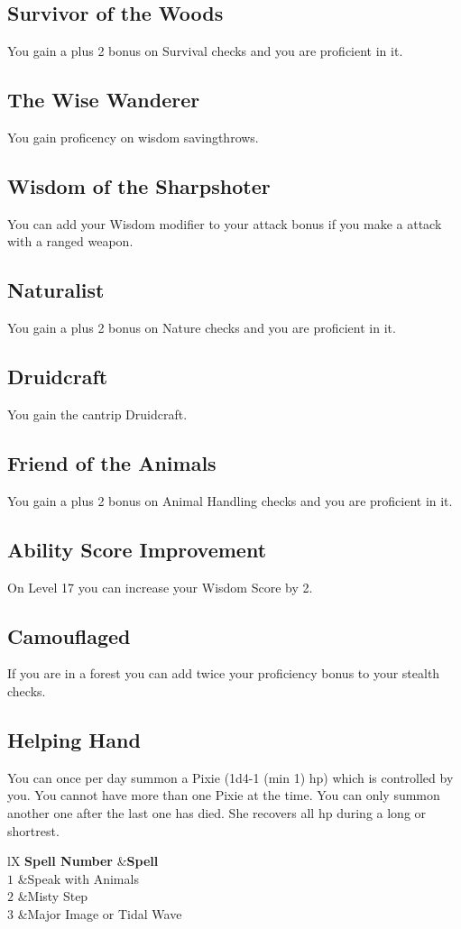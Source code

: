 \documentclass[a4paper,10pt,twoside,twocolumn]{dndbook} %
\begin{document}
	\subsection{Survivor of the Woods}
	You gain a plus 2 bonus on Survival checks and you are proficient in it.
	\subsection{The Wise Wanderer}
	You gain proficency on wisdom savingthrows.
	\subsection{Wisdom of the Sharpshoter}
	You can add your Wisdom modifier to your attack bonus if you make a attack with a ranged weapon.
	\subsection{Naturalist}
	You gain a plus 2 bonus on Nature checks and you are proficient in it.
	\subsection{Druidcraft}
	You gain the cantrip Druidcraft.
	\subsection{Friend of the Animals}
	You gain a plus 2 bonus on Animal Handling checks and you are proficient in it.
	\subsection{Ability Score Improvement}
	On Level 17 you can increase your Wisdom Score by 2.
	\subsection{Camouflaged}
	If you are in a forest you can add twice your proficiency bonus to your stealth checks.
	\subsection{Helping Hand}
	You can once per day summon a Pixie (1d4-1 (min 1) hp) which is controlled by you. You cannot have more than one Pixie at the time. You can only summon another one after the last one has died. She recovers all hp during a long or shortrest.
	\begin{DndTable}[header=Spells]{lX}
		\textbf{Spell Number}	&\textbf{Spell}\\
		$1$						&Speak with Animals\\
		$2$						&Misty Step\\
		$3$						&Major Image or Tidal Wave\\
	\end{DndTable}
\end{document}
